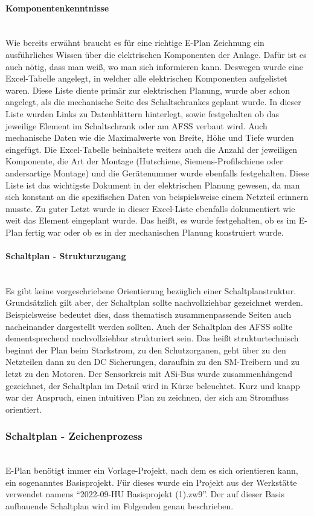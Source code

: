     \paragraph{Komponentenkenntnisse}\mbox{}\\
    Wie bereits erwähnt braucht es für eine richtige E-Plan Zeichnung ein ausführliches Wissen über die elektrischen Komponenten der Anlage. Dafür ist es auch nötig, dass man weiß, wo man sich informieren kann. Deswegen wurde eine Excel-Tabelle angelegt, in welcher alle elektrischen Komponenten aufgelistet waren. Diese Liste diente primär zur elektrischen Planung, wurde aber schon angelegt, als die mechanische Seite des Schaltschrankes geplant wurde. In dieser Liste wurden Links zu Datenblättern hinterlegt, sowie festgehalten ob das jeweilige Element im Schaltschrank oder am AFSS verbaut wird. Auch mechanische Daten wie die Maximalwerte von Breite, Höhe und Tiefe wurden eingefügt. Die Excel-Tabelle beinhaltete weiters auch die Anzahl der jeweiligen Komponente, die Art der Montage (Hutschiene, Siemens-Profilschiene oder andersartige Montage) und die Gerätenummer wurde ebenfalls festgehalten. Diese Liste ist das wichtigste Dokument in der elektrischen Planung gewesen, da man sich konstant an die spezifischen Daten von beispielsweise einem Netzteil erinnern musste. Zu guter Letzt wurde in dieser Excel-Liste ebenfalls dokumentiert wie weit das Element eingeplant wurde. Das heißt, es wurde festgehalten, ob es im E-Plan fertig war oder ob es in der mechanischen Planung konstruiert wurde.
    \paragraph{Schaltplan - Strukturzugang}\mbox{}\\
    Es gibt keine vorgeschriebene Orientierung bezüglich einer Schaltplanstruktur. Grundsätzlich gilt aber, der Schaltplan sollte nachvollziehbar gezeichnet werden. Beispielsweise bedeutet dies, dass thematisch zusammenpassende Seiten auch nacheinander dargestellt werden sollten. Auch der Schaltplan des AFSS sollte dementsprechend nachvollziehbar strukturiert sein. Das heißt strukturtechnisch beginnt der Plan beim Starkstrom, zu den Schutzorganen, geht über zu den Netzteilen dann zu den DC Sicherungen, daraufhin zu den SM-Treibern und zu letzt zu den Motoren. Der Sensorkreis mit ASi-Bus wurde zusammenhängend gezeichnet, der Schaltplan im Detail wird in Kürze beleuchtet. Kurz und knapp war der Anspruch, einen intuitiven Plan zu zeichnen, der sich am Stromfluss orientiert. 
\subsubsection{Schaltplan - Zeichenprozess}\mbox{}\\
    E-Plan benötigt immer ein Vorlage-Projekt, nach dem es sich orientieren kann, ein sogenanntes Basisprojekt. Für dieses wurde ein Projekt aus der Werkstätte verwendet namens \enquote{2022-09-HU Basisprojekt (1).zw9}. Der auf dieser Basis aufbauende Schaltplan wird im Folgenden genau beschrieben.
